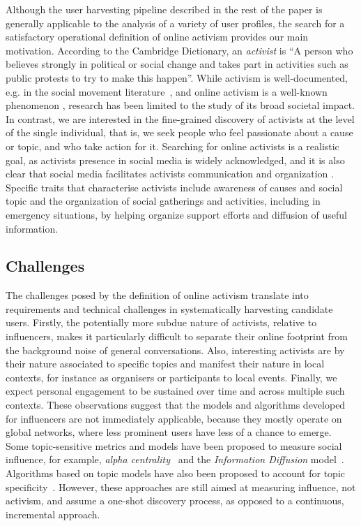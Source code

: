 \documentclass[runningheads]{llncs}
\begin{document}
Although the user harvesting pipeline described in the rest of the paper is generally applicable to the analysis of a variety of user profiles, the search for a satisfactory operational definition of online activism 
provides our main motivation. 
%
According to the Cambridge Dictionary, an \textit{activist} is ``A person who believes strongly in political or social change and takes part in activities such as public protests to try to make this happen''.
%
While activism is well-documented, e.g. in the social movement literature~\cite{doi:10.1080/14742830701497277}, and online activism is a well-known phenomenon \cite{IJoC1246}, research has been limited to the study of its broad societal impact. 
In contrast, we are interested in the fine-grained discovery of activists at the level of the single individual, that is, we seek people who feel passionate about a cause or topic, and who take action for it. 
Searching for online activists is a realistic goal, as activists presence in social media is widely acknowledged, and it is also clear that social media facilitates activists communication and organization \cite{Poell2014,Youmans2012}. 
Specific traits that characterise activists include awareness of causes and social topic and the organization of social gatherings and activities, including in emergency situations, by helping organize support efforts and diffusion of useful information.
 
\subsection{Challenges}
 
The challenges posed by the definition of online activism translate into requirements and technical challenges in systematically harvesting candidate users.
%
Firstly, the potentially more subdue nature of activists, relative to influencers, makes it particularly difficult to separate their online footprint from the background noise of general conversations.
Also, interesting activists are by their nature associated to specific topics and manifest their nature in local contexts, for instance as organisers or participants to local events. 
Finally, we expect personal engagement to be sustained over time and across multiple such contexts. 
These observations suggest that the models and algorithms developed for influencers are not immediately applicable, because they mostly operate on global networks, where less prominent users have less of a chance to emerge.
Some topic-sensitive metrics and models have been proposed to measure social influence, for example, \textit{alpha centrality}~\cite{Bonacich2001,Overbey2013} and the \textit{Information Diffusion} model~\cite{Pal2011}. Algorithms based on topic models have also been proposed to account for topic specificity~\cite{Zhao2011b}. However, these approaches are still aimed at measuring influence, not activism, and assume a one-shot discovery process, as opposed to a continuous, incremental approach.
\end{document}

